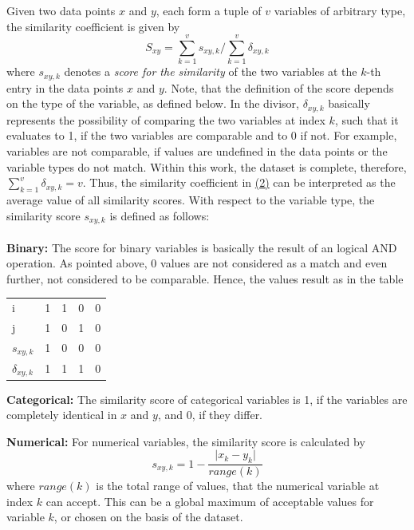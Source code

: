 	Given two data points $x$ and $y$, each form a tuple of $v$ variables of arbitrary type, the similarity coefficient is given by
	\begin{equation}\label{eq1}
	S_{xy} = \sum_{k=1}^{v} s_{xy,k} / \sum_{k=1}^{v} \delta_{xy,k} 
	\end{equation} 
	where $s_{xy,k}$ denotes a \textit{score for the similarity} of the two variables at the $k$-th entry in the data points $x$ and $y$. Note, that the definition of the score depends on the
	type of the variable, as defined below. In the divisor, $\delta_{xy,k}$ basically represents the possibility of comparing the two variables at index $k$, such that it evaluates to 1, if the two variables are comparable and to 0 if not. %
	For example, variables are not comparable, if values are undefined in the data points or the variable types do not match. Within this work, the dataset is complete, therefore, $\sum_{k=1}^{v} \delta_{xy,k}=v$. Thus, the similarity coefficient in \hyperref[eq1]{(2)} can be interpreted as the average value of all similarity scores. 
	With respect to the variable type, the similarity score $s_{xy,k}$ is defined as follows:\\
	\\ \textbf{Binary:} The score for binary variables is basically the result of an logical AND operation. As pointed above, 0 values are not considered as a match and even further, not considered to be comparable. Hence, the values result as in the table
		\begin{center}
			\begin{tabular}{l | c c c r}
				i & 1 & 1 & 0 & 0 \\
				j & 1 & 0 & 1 & 0 \\
				\hline
				$s_{xy,k}$ & 1 & 0 & 0 & 0 \\
				$\delta_{xy,k}$ & 1 & 1 & 1 & 0
			\end{tabular}
		\end{center}	
	\textbf{Categorical:} The similarity score of categorical variables is 1, if the variables are completely identical in $x$ and $y$, and 0, if they differ.
	
	\textbf{Numerical:} For numerical variables, the similarity score is calculated by
		\begin{equation*}
		s_{xy,k} = 1 - \frac{\vert x_k - y_k \vert}{range(k)}
		\end{equation*}
		where $range(k)$ is the total range of values, that the numerical variable at index $k$ can accept. This can be a global maximum of acceptable values for variable $k$, or chosen on the basis of the dataset.

